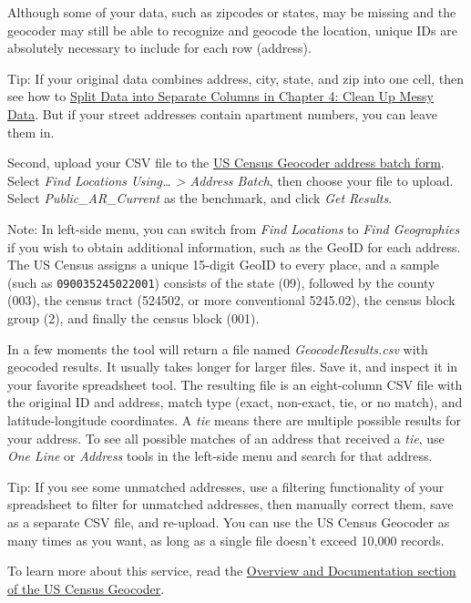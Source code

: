 \documentclass[
  english,
]{book}
\begin{document}
Although some of your data, such as zipcodes or states, may be missing and the geocoder may still be able to recognize and geocode the location, unique IDs are absolutely necessary to include for each row (address).

Tip: If your original data combines address, city, state, and zip into one cell, then see how to \href{split-data.html}{Split Data into Separate Columns in Chapter 4: Clean Up Messy Data}. But if your street addresses contain apartment numbers, you can leave them in.

Second, upload your CSV file to the \href{https://geocoding.geo.census.gov/geocoder/locations/addressbatch?form}{US Census Geocoder address batch form}. Select \emph{Find Locations Using\ldots{} \textgreater{} Address Batch}, then choose your file to upload. Select \emph{Public\_AR\_Current} as the benchmark, and click \emph{Get Results}.

Note: In left-side menu, you can switch from \emph{Find Locations} to \emph{Find Geographies}
if you wish to obtain additional information, such as the GeoID for each address. The US Census assigns a unique 15-digit GeoID to every place, and a sample (such as \texttt{090035245022001}) consists of the state (09), followed by the county (003),
the census tract (524502, or more conventional 5245.02),
the census block group (2), and finally the census block (001).

In a few moments the tool will return a
file named \emph{GeocodeResults.csv} with geocoded results. It usually takes longer for larger files.
Save it, and inspect it in your favorite spreadsheet tool. The resulting file is
an eight-column CSV file with the original ID and address, match type (exact, non-exact, tie, or no match),
and latitude-longitude coordinates. A \emph{tie} means there are multiple possible results for your address. To see all possible matches of an address that received a \emph{tie}, use \emph{One Line} or \emph{Address} tools in the left-side menu and search for that address.

Tip: If you see some unmatched addresses, use a filtering functionality of your
spreadsheet to filter for unmatched addresses, then manually correct them,
save as a separate CSV file, and re-upload. You can use the US Census Geocoder as many
times as you want, as long as a single file doesn't exceed 10,000 records.

To learn more about this service, read the \href{https://www.census.gov/programs-surveys/geography/technical-documentation/complete-technical-documentation/census-geocoder.html}{Overview and Documentation section of the US Census Geocoder}.
\end{document}
